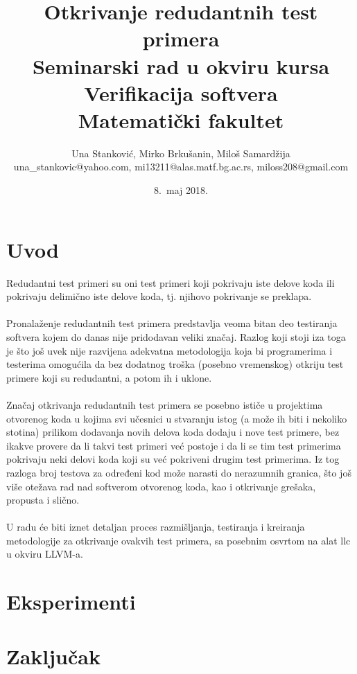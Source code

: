 \documentclass[a4paper]{article}
\begin{document}
\title{Otkrivanje redudantnih test primera\\ \small{Seminarski rad u okviru kursa\\Verifikacija softvera\\ Matematički fakultet}}

\author{Una Stanković, Mirko Brkušanin, Miloš Samardžija\\ una\_stankovic@yahoo.com, mi13211@alas.matf.bg.ac.rs, miloss208@gmail.com}
\date{8.~maj 2018.}
\maketitle


\tableofcontents

\newpage

\section{Uvod}
\label{sec:uvod}
Redudantni test primeri su oni test primeri koji pokrivaju iste delove koda ili pokrivaju delimično iste delove koda, tj. njihovo pokrivanje se preklapa.\\\\
Pronalaženje redudantnih test primera predstavlja veoma bitan deo testiranja softvera kojem do danas nije pridodavan veliki značaj. Razlog koji stoji iza toga je što još uvek nije razvijena adekvatna metodologija koja bi programerima i testerima omogućila da bez dodatnog troška (posebno vremenskog) otkriju test primere koji su redudantni, a potom ih i uklone.\\\\
Značaj otkrivanja redudantnih test primera se posebno ističe u projektima otvorenog koda u kojima svi učesnici u stvaranju istog (a može ih biti i nekoliko stotina) prilikom dodavanja novih delova koda dodaju i nove test primere, bez ikakve provere da li takvi test primeri već postoje i da li se tim test primerima pokrivaju neki delovi koda koji su već pokriveni drugim test primerima. Iz tog razloga broj testova za određeni kod može narasti do nerazumnih granica, što još više otežava rad nad softverom otvorenog koda, kao i otkrivanje grešaka, propusta i slično. \\\\
U radu će biti iznet detaljan proces razmišljanja, testiranja i kreiranja metodologije za otkrivanje ovakvih test primera, sa posebnim osvrtom na alat llc u okviru LLVM-a. 

\section{Eksperimenti}
\label{sec:prvi}



\section{Zaključak}
\label{sec:zakljucak}

\appendix
 

\end{document}

